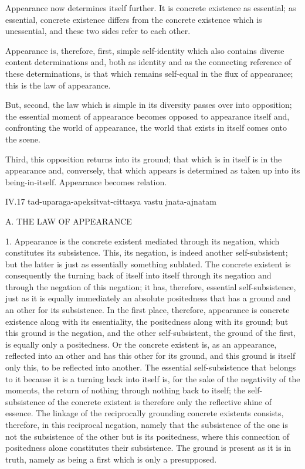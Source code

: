 Appearance now determines itself further.
It is concrete existence as essential;
as essential, concrete existence
differs from the concrete existence
which is unessential,
and these two sides
refer to each other.

Appearance is, therefore,
first, simple self-identity
which also contains
diverse content determinations
and, both as identity
and as the connecting reference
of these determinations,
is that which remains self-equal
in the flux of appearance;
this is the law of appearance.

But, second, the law which is
simple in its diversity
passes over into opposition;
the essential moment of appearance becomes
opposed to appearance itself
and, confronting the world of appearance,
the world that exists in itself
comes onto the scene.

Third, this opposition returns into its ground;
that which is in itself is in the appearance
and, conversely, that which appears is determined
as taken up into its being-in-itself.
Appearance becomes relation.

IV.17
tad-uparaga-apeksitvat-cittasya vastu jnata-ajnatam

A. THE LAW OF APPEARANCE

1. Appearance is the concrete existent
mediated through its negation,
which constitutes its subsistence.
This, its negation, is
indeed another self-subsistent;
but the latter is just as
essentially something sublated.
The concrete existent is consequently
the turning back of itself into itself
through its negation and through
the negation of this negation;
it has, therefore, essential self-subsistence,
just as it is equally immediately an absolute positedness
that has a ground and an other for its subsistence.
In the first place, therefore, appearance is
concrete existence along with its essentiality,
the positedness along with its ground;
but this ground is the negation,
and the other self-subsistent,
the ground of the first,
is equally only a positedness.
Or the concrete existent is,
as an appearance,
reflected into an other
and has this other for its ground,
and this ground is itself only this,
to be reflected into another.
The essential self-subsistence
that belongs to it because
it is a turning back into itself is,
for the sake of the negativity of the moments,
the return of nothing through nothing back to itself;
the self-subsistence of the concrete existent is
therefore only the reflective shine of essence.
The linkage of the reciprocally grounding
concrete existents consists, therefore,
in this reciprocal negation,
namely that the subsistence of the one is not
the subsistence of the other but is its positedness,
where this connection of positedness
alone constitutes their subsistence.
The ground is present as it is in truth,
namely as being a first which is only a presupposed.

